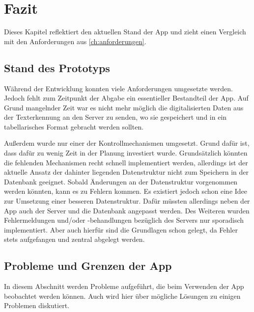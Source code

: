 \documentclass[notables, nomenclature, oneside, 150]{HSMW-Thesis}
\begin{document}

\chapter{Fazit}\label{ch:fazit}
	Dieses Kapitel reflektiert den aktuellen Stand der App und zieht einen Vergleich mit den Anforderungen aus \autoref{ch:anforderungen}.
	
	\section{Stand des Prototyps}
		Während der Entwicklung konnten viele Anforderungen umgesetzte werden. Jedoch fehlt zum Zeitpunkt der Abgabe ein essentieller Bestandteil der App. Auf Grund mangelnder Zeit war es nicht mehr möglich die digitalisierten Daten aus der Texterkennung an den Server zu senden, wo sie gespeichert und in ein tabellarisches Format gebracht werden sollten. 
		
		Außerdem wurde nur einer der Kontrollmechanismen umgesetzt. Grund dafür ist, dass dafür zu wenig Zeit in der Planung investiert wurde. Grundsätzlich könnten die fehlenden Mechanismen recht schnell implementiert werden, allerdings ist der aktuelle Ansatz der dahinter liegenden Datenstruktur nicht zum Speichern in der Datenbank geeignet. Sobald Änderungen an der Datenstruktur vorgenommen werden könnten, kann es zu Fehlern kommen. Es existiert jedoch schon eine Idee zur Umsetzung einer besseren Datenstruktur. Dafür müssten allerdings neben der App auch der Server und die Datenbank angepasst werden. Des Weiteren wurden Fehlermeldungen und/oder -behandlungen bezüglich des Servers nur sporadisch implementiert. Aber auch hierfür sind die Grundlagen schon gelegt, da Fehler stets aufgefangen und zentral abgelegt werden. 
	
%	
%	
%	
%	
%	
%	
	\section{Probleme und Grenzen der App}\label{sc:grenzen}
		In diesem Abschnitt werden Probleme aufgeführt, die beim Verwenden der App beobachtet werden können. Auch wird hier über mögliche Lösungen zu einigen Problemen diskutiert.
\end{document}
